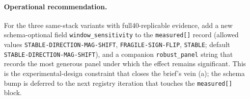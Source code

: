 \paragraph{Operational recommendation.}
For the three same-stack variants with full40-replicable evidence,
add a new schema-optional field \texttt{window\_sensitivity} to the
\texttt{measured[]} record (allowed values
\texttt{STABLE-DIRECTION-MAG-SHIFT}, \texttt{FRAGILE-SIGN-FLIP},
\texttt{STABLE}; default \texttt{STABLE-DIRECTION-MAG-SHIFT}), and
a companion \texttt{robust\_panel} string that records the most
generous panel under which the effect remains significant. This is
the experimental-design constraint that closes the brief's vein
(a); the schema bump is deferred to the next registry iteration
that touches the \texttt{measured[]} block.
